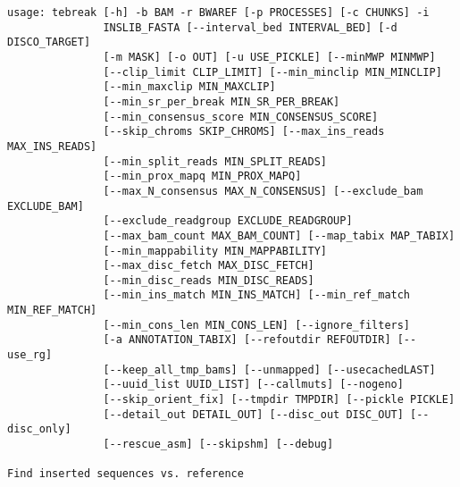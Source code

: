 \documentclass[letterpaper,11pt]{article}
\begin{document}
\begin{verbatim}
usage: tebreak [-h] -b BAM -r BWAREF [-p PROCESSES] [-c CHUNKS] -i
               INSLIB_FASTA [--interval_bed INTERVAL_BED] [-d DISCO_TARGET]
               [-m MASK] [-o OUT] [-u USE_PICKLE] [--minMWP MINMWP]
               [--clip_limit CLIP_LIMIT] [--min_minclip MIN_MINCLIP]
               [--min_maxclip MIN_MAXCLIP]
               [--min_sr_per_break MIN_SR_PER_BREAK]
               [--min_consensus_score MIN_CONSENSUS_SCORE]
               [--skip_chroms SKIP_CHROMS] [--max_ins_reads MAX_INS_READS]
               [--min_split_reads MIN_SPLIT_READS]
               [--min_prox_mapq MIN_PROX_MAPQ]
               [--max_N_consensus MAX_N_CONSENSUS] [--exclude_bam EXCLUDE_BAM]
               [--exclude_readgroup EXCLUDE_READGROUP]
               [--max_bam_count MAX_BAM_COUNT] [--map_tabix MAP_TABIX]
               [--min_mappability MIN_MAPPABILITY]
               [--max_disc_fetch MAX_DISC_FETCH]
               [--min_disc_reads MIN_DISC_READS]
               [--min_ins_match MIN_INS_MATCH] [--min_ref_match MIN_REF_MATCH]
               [--min_cons_len MIN_CONS_LEN] [--ignore_filters]
               [-a ANNOTATION_TABIX] [--refoutdir REFOUTDIR] [--use_rg]
               [--keep_all_tmp_bams] [--unmapped] [--usecachedLAST]
               [--uuid_list UUID_LIST] [--callmuts] [--nogeno]
               [--skip_orient_fix] [--tmpdir TMPDIR] [--pickle PICKLE]
               [--detail_out DETAIL_OUT] [--disc_out DISC_OUT] [--disc_only]
               [--rescue_asm] [--skipshm] [--debug]

Find inserted sequences vs. reference


\end{verbatim}
\end{document}
